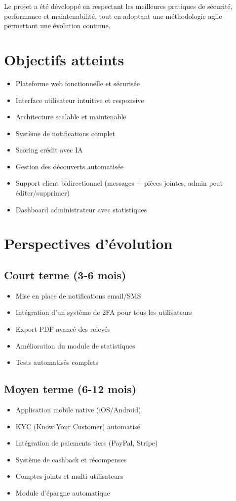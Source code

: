 \documentclass[12pt,a4paper]{report}
\begin{document}
Le projet a été développé en respectant les meilleures pratiques de sécurité, performance et maintenabilité, tout en adoptant une méthodologie agile permettant une évolution continue.

\section{Objectifs atteints}
\begin{itemize}[leftmargin=1.5cm]
    \item \checkmark{} Plateforme web fonctionnelle et sécurisée
    \item \checkmark{} Interface utilisateur intuitive et responsive
    \item \checkmark{} Architecture scalable et maintenable
    \item \checkmark{} Système de notifications complet
    \item \checkmark{} Scoring crédit avec IA
    \item \checkmark{} Gestion des découverts automatisée
    \item \checkmark{} Support client bidirectionnel (messages + pièces jointes, admin peut éditer/supprimer)
    \item \checkmark{} Dashboard administrateur avec statistiques
\end{itemize}

\section{Perspectives d'évolution}

\subsection{Court terme (3-6 mois)}
\begin{itemize}[leftmargin=1.5cm]
    \item Mise en place de notifications email/SMS
    \item Intégration d'un système de 2FA pour tous les utilisateurs
    \item Export PDF avancé des relevés
    \item Amélioration du module de statistiques
    \item Tests automatisés complets
\end{itemize}

\subsection{Moyen terme (6-12 mois)}
\begin{itemize}[leftmargin=1.5cm]
    \item Application mobile native (iOS/Android)
    \item KYC (Know Your Customer) automatisé
    \item Intégration de paiements tiers (PayPal, Stripe)
    \item Système de cashback et récompenses
    \item Comptes joints et multi-utilisateurs
    \item Module d'épargne automatique
\end{itemize}
\end{document}
